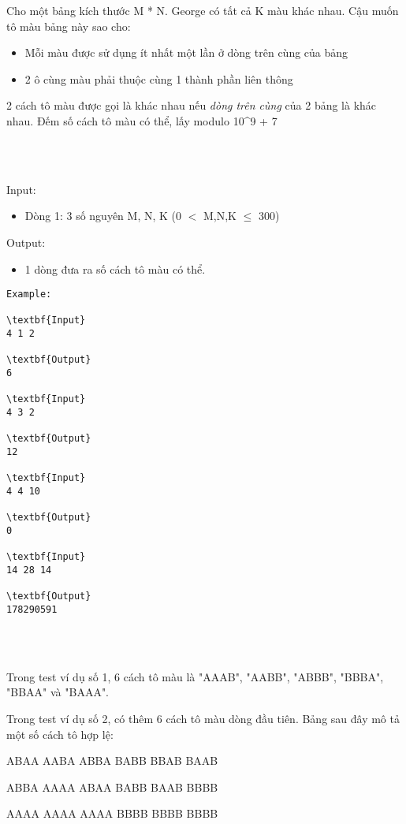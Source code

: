 

Cho một bảng kích thước M * N. George có tất cả K màu khác nhau. Cậu muốn tô màu bảng này sao cho:
\begin{itemize}
	\item 

Mỗi màu được sử dụng ít nhất một lần ở dòng trên cùng của bảng
	\item 

2 ô cùng màu phải thuộc cùng 1 thành phần liên thông
\end{itemize}

2 cách tô màu được gọi là khác nhau nếu \emph{ dòng trên cùng } của 2 bảng là khác nhau. Đếm số cách tô màu có thể, lấy modulo 10^9 + 7


\\ 

Input:
\begin{itemize}
	\item 

Dòng 1: 3 số nguyên M, N, K (0 $<$ M,N,K  $\le$  300)
\end{itemize}

Output:
\begin{itemize}
	\item 

1 dòng đưa ra số cách tô màu có thể.
\end{itemize}
\begin{verbatim}
Example:

\textbf{Input}
4 1 2

\textbf{Output}
6

\textbf{Input}
4 3 2

\textbf{Output}
12

\textbf{Input}
4 4 10

\textbf{Output}
0

\textbf{Input}
14 28 14

\textbf{Output}
178290591\end{verbatim}


\\ 

Trong test ví dụ số 1, 6 cách tô màu là "AAAB", "AABB", "ABBB", "BBBA", "BBAA" và "BAAA".

Trong test ví dụ số 2, có thêm 6 cách tô màu dòng đầu tiên. Bảng sau đây mô tả một số cách tô hợp lệ:

ABAA AABA ABBA BABB BBAB BAAB

ABBA AAAA ABAA BABB BAAB BBBB

AAAA AAAA AAAA BBBB BBBB BBBB


\\ 
